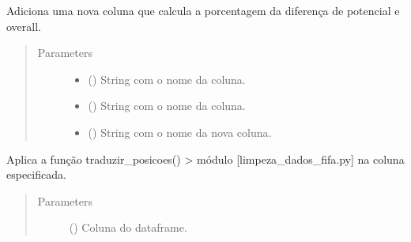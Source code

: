 \documentclass[letterpaper,10pt,brazil]{sphinxmanual}
\begin{document}
\begin{fulllineitems}
\begin{fulllineitems}
\begin{quote}
\begin{description}
\end{description}\end{quote}

\end{fulllineitems}


\begin{fulllineitems}
\label{\detokenize{classe_Fifa_limp:id4}}
Adiciona uma nova coluna que calcula a porcentagem da diferença de potencial e overall.
\begin{quote}\begin{description}
\item[{Parameters}] \leavevmode\begin{itemize}
\item {} 
 () \textendash{} String com o nome da coluna.

\item {} 
 () \textendash{} String com o nome da coluna.

\item {} 
 () \textendash{} String com o nome da nova coluna.

\end{itemize}

\end{description}\end{quote}

\end{fulllineitems}


\begin{fulllineitems}
\label{\detokenize{classe_Fifa_limp:id5}}
Aplica a função traduzir\_posicoes() \sphinxhyphen{}\textgreater{} módulo {[}limpeza\_dados\_fifa.py{]}\sphinxhyphen{} na coluna especificada.
\begin{quote}\begin{description}
\item[{Parameters}] \leavevmode
{} () \textendash{} Coluna do dataframe.


\end{description}
\end{quote}
\end{fulllineitems}
\end{fulllineitems}
\end{document}
